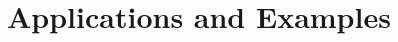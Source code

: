 \documentclass[a4paper,twoside]{article}
\theoremstyle{plain}
\newtheorem{theorem}{Theorem}[section]
\newtheorem{lemma}[theorem]{Lemma}
\theoremstyle{definition}
\theoremstyle{remark}
\newcommand{\reals}{\mathbb{R}}
\newcommand{\integers}{\mathbb{Z}}
\newcommand{\iso}{\cong}
\DeclareMathOperator{\TC}{TC}
\begin{document}
\section{Applications and Examples}





\end{document}
